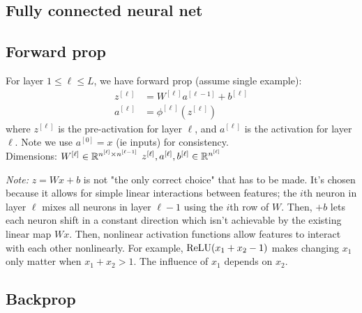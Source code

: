 \documentclass[12pt]{article}
\begin{document}
\pagebreak
\begin{outline}

\section{Fully connected neural net}

\subsection{Forward prop}

For layer $1 \le \ell \le L$, we have forward prop (assume single example):
\begin{align*}
    z^{[\ell]} &= W^{[\ell]} a^{[\ell-1]} + b^{[\ell]} \\
    a^{[\ell]} &= \phi^{[\ell]}(z^{[\ell]})
\end{align*}
where $z^{[\ell]}$ is the pre-activation for layer $\ell$, and $a^{[\ell]}$ is the activation for layer $\ell$. Note we use $a^{[0]}=x$ (ie inputs) for consistency.\\

Dimensions:
\1 $W^{[\ell]} \in \mathbb{R}^{n^{[\ell]} \times n^{[\ell-1]}}$
\1 $z^{[\ell]},a^{[\ell]},b^{[\ell]} \in \mathbb{R}^{n^{[\ell]}}$
\\\0

\textit{Note:} $z = Wx + b$ is not "the only correct choice" that has to be made. It's chosen because it allows for simple linear interactions between features; the $i$th neuron in layer $\ell$ mixes all neurons in layer $\ell-1$ using the $i$th row of $W$. Then, $+b$ lets each neuron shift in a constant direction which isn't achievable by the existing linear map $Wx$. Then, nonlinear activation functions allow features to interact with each other nonlinearly.
\1 For example, $\operatorname{ReLU}(x_1+x_2-1)$ makes changing $x_1$ only matter when $x_1+x_2>1$. The influence of $x_1$ depends on $x_2$.
\0

\subsection{Backprop}


\end{outline}
\end{document}
